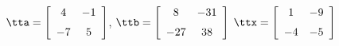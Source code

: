 {$\tta = \left[ \begin {array}{cc} 4&-1 \\ \noalign{\medskip} -7&5 \end {array} \right] $, \quad
$\ttb=\left[ \begin {array}{cc} 8 & -31\\ \noalign{\medskip} -27 & 38  \end {array} \right] $}
{$\ttx=\left[ \begin {array}{cc} 1 & -9\\ \noalign{\medskip} -4 & -5  \end {array} \right] $}
